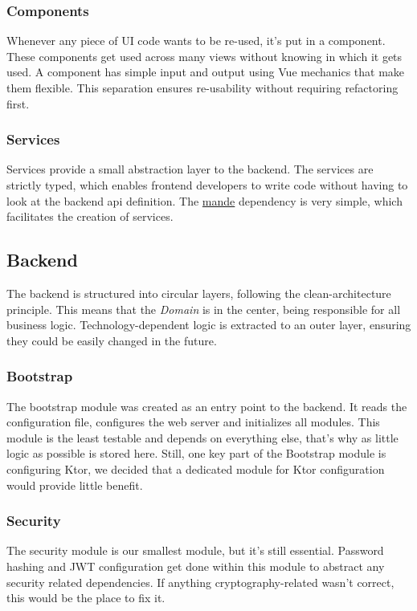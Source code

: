 \subsubsection*{Components}
Whenever any piece of UI code wants to be re-used, it's put in a component.
These components get used across many views without knowing in which it gets used.
A component has simple input and output using Vue mechanics that make them flexible.
This separation ensures re-usability without requiring refactoring first.

\subsubsection*{Services}
Services provide a small abstraction layer to the backend.
The services are strictly typed, which enables frontend developers to write code without having to look at the backend api definition.
The \href{https://github.com/posva/mande}{mande} dependency is very simple, which facilitates the creation of services.

\subsection{Backend}
The backend is structured into circular layers, following the clean-architecture principle.
This means that the \emph{Domain} is in the center, being responsible for all business logic.
Technology-dependent logic is extracted to an outer layer, ensuring they could be easily changed in the future.

\subsubsection*{Bootstrap}
The bootstrap module was created as an entry point to the backend.
It reads the configuration file, configures the web server and initializes all modules.
This module is the least testable and depends on everything else, that's why as little logic as possible is stored here.
Still, one key part of the Bootstrap module is configuring Ktor, we decided that a dedicated module for Ktor configuration would provide little benefit.

\subsubsection*{Security}
The security module is our smallest module, but it's still essential.
Password hashing and JWT configuration get done within this module to abstract any security related dependencies.
If anything cryptography-related wasn't correct, this would be the place to fix it.

